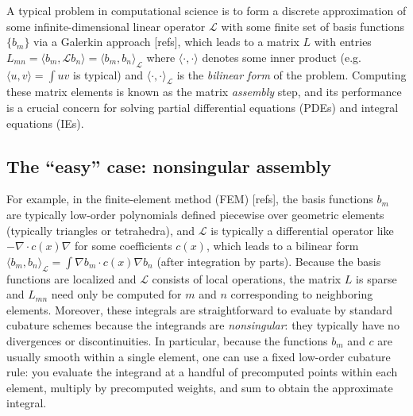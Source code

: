 A typical problem in computational science is to form a discrete approximation of some infinite-dimensional linear operator $\mathcal{L}$ with some finite set of basis functions $\{ b_m \}$ via a Galerkin approach [refs], which leads to a matrix $L$ with entries $L_{mn} = \langle b_m, \mathcal{L} b_n \rangle = \langle b_m, b_n \rangle_\mathcal{L}$ where $\langle \cdot, \cdot \rangle$ denotes some inner product (e.g. $\langle u, v \rangle = \int u v$ is typical) and  $\langle \cdot, \cdot \rangle_\mathcal{L}$ is the \emph{bilinear form} of the problem.  Computing these matrix elements is known as the matrix \emph{assembly} step, and its performance is a crucial concern for solving partial differential equations (PDEs) and integral equations (IEs).

\subsection{The ``easy'' case: nonsingular assembly}

For example, in the finite-element method (FEM) [refs], the basis functions $b_m$ are typically low-order polynomials defined piecewise over geometric elements (typically triangles or tetrahedra), and $\mathcal{L}$ is typically a differential operator like $-\nabla \cdot c(x) \nabla$ for some coefficients $c(x)$, which leads to a bilinear form  $\langle b_m, b_n \rangle_\mathcal{L} = \int \nabla b_m \cdot c(x) \nabla b_n$ (after integration by parts).   Because the basis functions are localized and $\mathcal{L}$ consists of local operations, the matrix $L$ is sparse and $L_{mn}$ need only be computed for $m$ and $n$ corresponding to neighboring elements. Moreover, these integrals are straightforward to evaluate by standard cubature schemes because the integrands are \emph{nonsingular}: they typically have no divergences or discontinuities. In particular, because the functions $b_m$ and $c$ are usually smooth within a single element, one can use a fixed low-order cubature rule: you evaluate the integrand at a handful of precomputed points within each element, multiply by precomputed weights, and sum to obtain the approximate integral.

